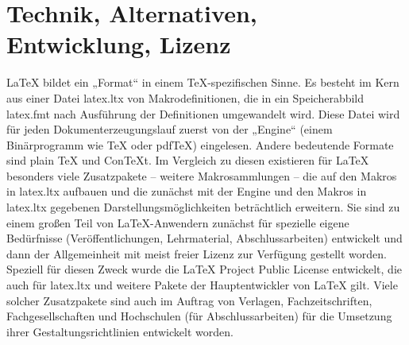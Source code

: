 \section{Technik, Alternativen, Entwicklung, Lizenz}
LaTeX bildet ein „Format“ in einem TeX-spezifischen Sinne. Es besteht im Kern aus einer Datei latex.ltx von Makrodefinitionen, die in ein Speicherabbild latex.fmt nach Ausführung der Definitionen umgewandelt wird. Diese Datei wird für jeden Dokumenterzeugungslauf zuerst von der „Engine“ (einem Binärprogramm wie TeX oder pdfTeX) eingelesen. Andere bedeutende Formate sind plain TeX und ConTeXt. Im Vergleich zu diesen existieren für LaTeX besonders viele Zusatzpakete – weitere Makrosammlungen – die auf den Makros in latex.ltx aufbauen und die zunächst mit der Engine und den Makros in latex.ltx gegebenen Darstellungsmöglichkeiten beträchtlich erweitern. Sie sind zu einem großen Teil von LaTeX-Anwendern zunächst für spezielle eigene Bedürfnisse (Veröffentlichungen, Lehrmaterial, Abschlussarbeiten) entwickelt und dann der Allgemeinheit mit meist freier Lizenz zur Verfügung gestellt worden. Speziell für diesen Zweck wurde die LaTeX Project Public License entwickelt, die auch für latex.ltx und weitere Pakete der Hauptentwickler von LaTeX gilt. Viele solcher Zusatzpakete sind auch im Auftrag von Verlagen, Fachzeitschriften, Fachgesellschaften und Hochschulen (für Abschlussarbeiten) für die Umsetzung ihrer Gestaltungsrichtlinien entwickelt worden.
